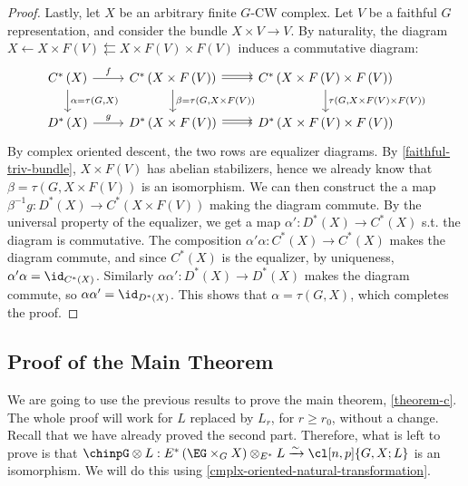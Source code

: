 \begin{proof}
	Lastly, let $X$ be an arbitrary finite $G$-CW complex.
	Let $V$ be a faithful $G$ representation, and consider the bundle $X \times V \to V$.
	By naturality, the diagram $X \leftarrow X \times F\left(V\right) \leftleftarrows X \times F\left(V\right) \times F\left(V\right)$ induces a commutative diagram:
	$$
	\begin{tikzcd}
		C^*\left(X\right) \arrow{r}{f} \arrow{d}{\alpha = \tau\left(G, X\right)}
		& C^*\left(X \times F\left(V\right)\right) \arrow{r}{} \arrow[shift left]{r}{} \arrow{d}{\beta = \tau\left(G, X \times F\left(V\right)\right)}
		& C^*\left(X \times F\left(V\right) \times F\left(V\right)\right) \arrow{d}{\tau\left(G, X \times F\left(V\right) \times F\left(V\right)\right)}
		\\
		D^*\left(X\right) \arrow{r}{g}
		& D^*\left(X \times F\left(V\right)\right) \arrow{r}{} \arrow[shift left]{r}{}
		& D^*\left(X \times F\left(V\right) \times F\left(V\right)\right)
	\end{tikzcd}
	$$
	By complex oriented descent, the two rows are equalizer diagrams.
	By \ref{faithful-triv-bundle}, $X \times F\left(V\right)$ has abelian stabilizers, hence we already know that $\beta = \tau\left(G, X \times F\left(V\right)\right)$ is an isomorphism.
	We can then construct the a map $\beta^{-1} g: D^*\left(X\right) \to C^*\left(X \times F\left(V\right)\right)$ making the diagram commute.
	By the universal property of the equalizer, we get a map $\alpha': D^*\left(X\right) \to C^*\left(X\right)$ s.t. the diagram is commutative.
	The composition $\alpha' \alpha: C^*\left(X\right) \to C^*\left(X\right)$ makes the diagram commute, and since $C^*\left(X\right)$ is the equalizer, by uniqueness, $\alpha' \alpha = \id_{C^*\left(X\right)}$.
	Similarly $\alpha \alpha': D^*\left(X\right) \to D^*\left(X\right)$ makes the diagram commute, so $\alpha \alpha' = \id_{D^*\left(X\right)}$.
	This shows that $\alpha = \tau\left(G, X\right)$, which completes the proof.
\end{proof}



\subsection{Proof of the Main Theorem}

We are going to use the previous results to prove the main theorem, \ref{theorem-c}.
The whole proof will work for $L$ replaced by $L_r$, for $r \geq r_0$, without a change.
Recall that we have already proved the second part.
Therefore, what is left to prove is that 
$\chinpG \otimes L: E^*\left(\EG \times_G X\right) \otimes_{E^*} L \xrightarrow{\sim} \cl[n,p]{G,X; L}$
is an isomorphism.
We will do this using \ref{cmplx-oriented-natural-transformation}.

